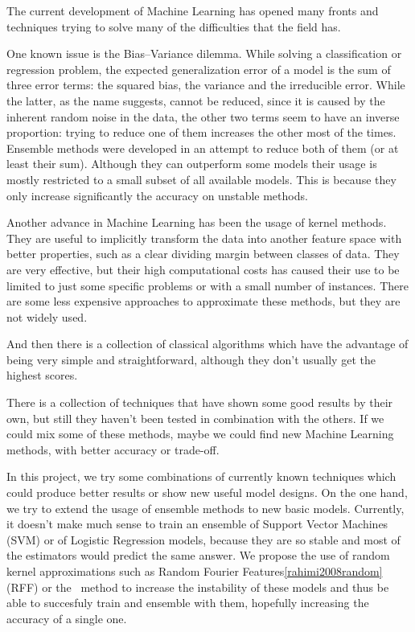 \begin{pre-delivery}
  The current development of Machine Learning has opened many fronts and
  techniques trying to solve many of the difficulties that the field has.

  One known issue is the Bias--Variance dilemma\cite{domingos2000unified}. While solving a classification
  or regression problem, the expected generalization error of a model is the
  sum of three error terms: the squared bias, the variance and the irreducible error.
  While the latter, as the name suggests, cannot be reduced, since it is
  caused by the inherent random noise in the data, the other two terms seem
  to have an inverse proportion: trying to reduce one of them increases the
  other most of the times.
  Ensemble methods\cite{polikar2006ensemble} were developed in an attempt to reduce both of them (or at
  least their sum).
  Although they can outperform some models
  their usage is mostly restricted to a small subset of all available models.
  This is because they only increase significantly the accuracy on unstable
  methods.

  Another advance in Machine Learning has been the usage of kernel methods\cite{Cortes1995}. They
  are useful to implicitly transform the data into another feature space with better properties,
  such as a clear dividing margin between classes of data. They are very
  effective, but their high computational costs has caused their use to be limited to just
  some specific problems or with a small number of instances. There are some
  less expensive approaches to approximate these methods, but they are not
  widely used\cite{rahimi2008random}\cite{NIPS2000_1866}.

  And then there is a collection of classical algorithms which have the
  advantage of being very simple and straightforward, although they don't
  usually get the highest scores.

  There is a collection of techniques that have shown some good results by their
  own, but still they haven't been tested in combination with the others. If we
  could mix some of these methods, maybe we could find new Machine Learning
  methods, with better accuracy or trade-off.

  In this project, we try some combinations of currently known techniques which
  could produce better results or show new useful model designs. On the one
  hand, we try to extend the usage of ensemble methods to new basic models.
  Currently, it doesn't make much sense to train an ensemble of Support Vector
  Machines (SVM) or of Logistic Regression models, because they are so stable and
  most of the estimators would predict the same answer. We propose the use of
  random kernel approximations such as Random Fourier Features\ref{rahimi2008random} (RFF) or the
  \Nys\ method\cite{NIPS2000_1866} to increase the instability of these models and thus be able to
  succesfuly train and ensemble with them, hopefully increasing the accuracy
  of a single one.


\end{pre-delivery}
